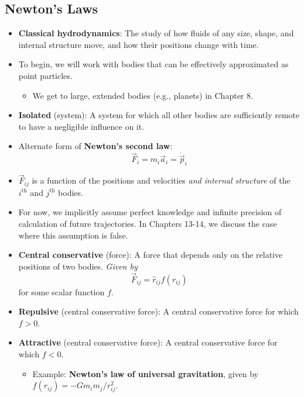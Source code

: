 \documentclass[../notes.tex]{subfiles}
\begin{document}
\subsection*{Newton's Laws}
\begin{itemize}
    \item \textbf{Classical hydrodynamics}: The study of how fluids of any size, shape, and internal structure move, and how their positions change with time.
    \item To begin, we will work with bodies that can be effectively approximated as point particles.
    \begin{itemize}
        \item We get to large, extended bodies (e.g., planets) in Chapter 8.
    \end{itemize}
    \item \textbf{Isolated} (system): A system for which all other bodies are sufficiently remote to have a negligible influence on it.
    \item Alternate form of \textbf{Newton's second law}:
    \begin{equation*}
        \vec{F}_i = m_i\vec{a}_i = \dot{\vec{p}}_i
    \end{equation*}
    \item $\vec{F}_{ij}$ is a function of the positions and velocities \emph{and internal structure} of the $i^\text{th}$ and $j^\text{th}$ bodies.
    \item For now, we implicitly assume perfect knowledge and infinite precision of calculation of future trajectories. In Chapters 13-14, we discuss the case where this assumption is false.
    \item \textbf{Central conservative} (force): A force that depends only on the relative positions of two bodies. \emph{Given by}
    \begin{equation*}
        \vec{F}_{ij} = \hat{r}_{ij}f(r_{ij})
    \end{equation*}
    for some scalar function $f$.
    \item \textbf{Repulsive} (central conservative force): A central conservative force for which $f>0$.
    \item \textbf{Attractive} (central conservative force): A central conservative force for which $f<0$.
    \begin{itemize}
        \item Example: \textbf{Newton's law of universal gravitation}, given by $f(r_{ij})=-Gm_im_j/r_{ij}^2$.
    \end{itemize}

\end{itemize}
\end{document}
